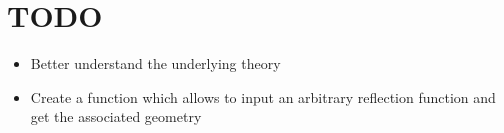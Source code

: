 \section{TODO}

\begin{itemize}
    \item Better understand the underlying theory
    \item Create a function which allows to input an arbitrary reflection function and get the associated geometry 
\end{itemize}
